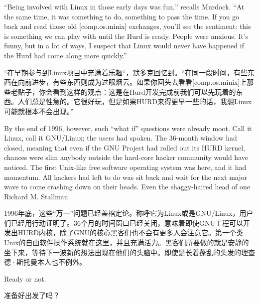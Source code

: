 \ifdefined\eng
``Being involved with Linux in those early days was fun,'' recalls Murdock. ``At the same time, it was something to do, something to pass the time. If you go back and read those old [comp.os.minix] exchanges, you'll see the sentiment: this is something we can play with until the Hurd is ready. People were anxious. It's funny, but in a lot of ways, I suspect that Linux would never have happened if the Hurd had come along more quickly.''
\fi

\ifdefined\chs
``在早期参与到Linux项目中充满着乐趣``，默多克回忆到。``在同一段时间，有些东西在向前进步，有些东西则成为过眼烟云。如果你回头去看看[comp.os.minix]上那些老贴子，你会看到这样的观点：这是在Hurd开发完成前我们可以先玩着的东西。人们总是性急的。它很好玩，但是如果HURD来得更早一些的话，我想Linux可能就根本不会出现。''
\fi

\ifdefined\eng
By the end of 1996, however, such ``what if'' questions were already moot. Call it Linux, call it GNU/Linux; the users had spoken. The 36-month window had closed, meaning that even if the GNU Project had rolled out its HURD kernel, chances were slim anybody outside the hard-core hacker community would have noticed. The first Unix-like free software operating system was here, and it had momentum. All hackers had left to do was sit back and wait for the next major wave to come crashing down on their heads. Even the shaggy-haired head of one Richard M. Stallman.
\fi

\ifdefined\chs
1996年底，这些``万一''问题已经盖棺定论。称呼它为Linux或是GNU/Linux，用户们已经用行动证明了。36个月的时间窗口已经关闭，意味着即使GNU工程可以开发出HURD内核，除了GNU的核心黑客们也不会有更多人会注意它。第一个类Unix的自由软件操作系统就在这里，并且充满活力。黑客们所要做的就是安静的坐下来，等待下一波新的想法出现在他们的头脑中。即使是长着蓬乱的头发的理查德·斯托曼本人也不例外。
\fi

\ifdefined\eng
Ready or not.
\fi

\ifdefined\chs
准备好出发了吗？
\fi

\theendnotes
\setcounter{endnote}{0}

